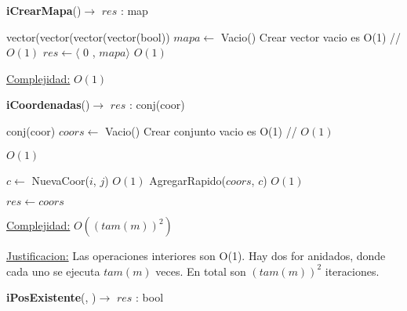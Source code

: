 \begin{Algoritmos}


\begin{algorithm}[H]
{\textbf{iCrearMapa}()$\to$ $res$ : map}
\begin{algorithmic}[1]
   
\State vector(vector(vector(vector(bool)) $mapa \gets$ Vacio()    \Comment Crear vector vacio es O(1) // $O(1)$
\State $res \gets  \langle$ 0 , $mapa \rangle $   \Comment $O(1)$

\medskip
\Statex \underline{Complejidad:} $O(1)$

\end{algorithmic}
\end{algorithm}

\begin{algorithm}[H]
{\textbf{iCoordenadas}()$\to$ $res$ : conj(coor)}
\begin{algorithmic}[1]
   

\State conj(coor) $coors \gets$ Vacio()      \Comment Crear conjunto vacio es O(1) // $O(1)$

	
		
		  \Comment $O(1)$
			
			\State $c \gets$ NuevaCoor($i$, $j$)   \Comment $O(1)$			
			\State AgregarRapido($coors$, $c$)   \Comment $O(1)$			
			
		\EndIf
		
	\EndFor

\EndFor

\State $res \gets coors$


\medskip
\Statex \underline{Complejidad:} $O((tam(m))^2)$

\Statex \underline{Justificacion:} Las operaciones interiores son O(1). Hay dos for anidados, donde cada uno se ejecuta $tam(m)$ veces. En total son $(tam(m))^2$ iteraciones. 

\end{algorithmic}
\end{algorithm}


\begin{algorithm}[H]
{\textbf{iPosExistente}(, )$\to$ $res$ : bool}
\begin{algorithmic}[1]
   

\end{algorithmic}
\end{algorithm}
\end{Algoritmos}
